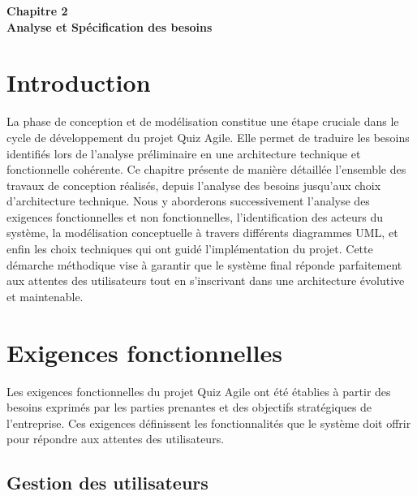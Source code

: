 \documentclass[12pt,a4paper]{report}
\begin{document}
\cleardoublepage
\thispagestyle{empty}
\begin{center}
    \vspace*{4cm}
    {\Huge \textbf{Chapitre 2}}\\[1.5cm]
    {\LARGE \textbf{Analyse et Spécification des besoins}}
\end{center}
\cleardoublepage

\setcounter{section}{0}

\section{Introduction}

La phase de conception et de modélisation constitue une étape cruciale
dans le cycle de développement du projet Quiz Agile. Elle permet de
traduire les besoins identifiés lors de l'analyse
préliminaire en une architecture technique et fonctionnelle cohérente.
Ce chapitre présente de manière détaillée l'ensemble des
travaux de conception réalisés, depuis l'analyse des
besoins jusqu'aux choix d'architecture
technique. Nous y aborderons successivement l'analyse
des exigences fonctionnelles et non fonctionnelles,
l'identification des acteurs du système, la modélisation
conceptuelle à travers différents diagrammes UML, et enfin les choix
techniques qui ont guidé l'implémentation du projet.
Cette démarche méthodique vise à garantir que le système final réponde
parfaitement aux attentes des utilisateurs tout en
s'inscrivant dans une architecture évolutive et
maintenable.

\section{Exigences fonctionnelles}

Les exigences fonctionnelles du projet Quiz Agile ont été établies à partir des besoins exprimés par les parties prenantes et des objectifs stratégiques de l'entreprise. Ces exigences définissent les fonctionnalités que le système doit offrir pour répondre aux attentes des utilisateurs.

\subsection{Gestion des utilisateurs}
\end{document}
